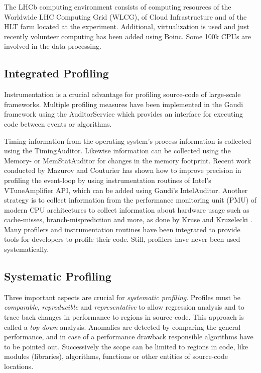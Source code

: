 \documentclass[a4paper]{jpconf}
\begin{document}
The LHCb computing environment consists of computing resources of the Worldwide LHC Computing Grid (WLCG), of Cloud Infrastructure and of the HLT farm located at the experiment. Additional, virtualization is used and just recently volunteer computing has been added using Boinc. Some 100k CPUs are involved in the data processing. 

\subsection{Integrated Profiling}
\label{sec:integrated_profiling}

Instrumentation is a crucial advantage for profiling source-code of large-scale frameworks. Multiple profiling measures have been implemented in the Gaudi framework using the AuditorService \cite{status_gaudi} which provides an interface for executing code between events or algorithms.

Timing information from the operating system's process information is collected using the TimingAuditor. Likewise information can be collected using the Memory- or MemStatAuditor for changes in the memory footprint. Recent work \cite{intel_auditor} conducted by Mazurov and Couturier has shown how to improve precision in profiling the event-loop by using instrumentation routines of Intel's VTune\texttrademark Amplifier API, which can be added using Gaudi's IntelAuditor. Another strategy is to collect information from the performance monitoring unit (PMU) of modern CPU architectures to collect information about hardware usage such as cache-misses, branch-misprediction and more, as done by Kruse and Kruzelecki \cite{modular_monitoring}. Many profilers and instrumentation routines have been integrated to provide tools for developers to profile their code. Still, profilers have never been used systematically.

\subsection{Systematic Profiling}
\label{sec:integrated_profiling}

Three important aspects are crucial for \textit{systematic profiling}. Profiles must be \textit{comparable}, \textit{reproducible} and \textit{representative} to allow regression analysis and to trace back changes in performance to regions in source-code. This approach is called a \textit{top-down} analysis. Anomalies are detected by comparing the general performance, and in case of a performance drawback responsible algorithms have to be pointed out. Successively the scope can be limited to regions in code, like modules (libraries), algorithms, functions or other entities of source-code locations.
\end{document}
